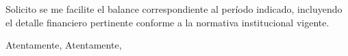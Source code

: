 \documentclass[a4paper,12pt]{article}
\begin{document}
\vspace{1cm}

\noindent
Solicito se me facilite el balance correspondiente al período indicado, incluyendo el detalle financiero pertinente conforme a la normativa institucional vigente.

\noindent Atentamente,
\noindent Atentamente,

\vspace{2.5cm}


\noindent{}  

\noindent{}      

\noindent{}  

\noindent{} 
\end{document}
